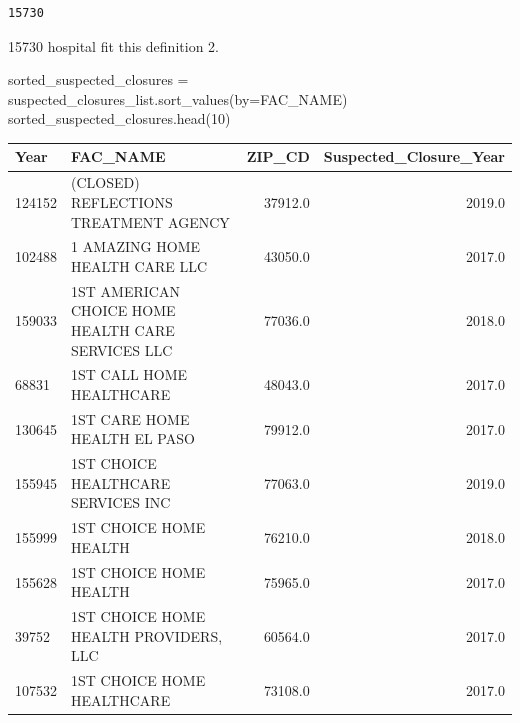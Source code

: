 \documentclass[
  letterpaper,
  DIV=11,
  numbers=noendperiod]{scrartcl}
\newenvironment{Shaded}{\begin{snugshade}}{\end{snugshade}}
\newcommand{\DecValTok}[1]{\textcolor[rgb]{0.68,0.00,0.00}{#1}}
\newcommand{\NormalTok}[1]{\textcolor[rgb]{0.00,0.23,0.31}{#1}}
\newcommand{\OperatorTok}[1]{\textcolor[rgb]{0.37,0.37,0.37}{#1}}
\newcommand{\StringTok}[1]{\textcolor[rgb]{0.13,0.47,0.30}{#1}}
\begin{document}
\begin{verbatim}
15730
\end{verbatim}

15730 hospital fit this definition 2.

\begin{Shaded}
\begin{Highlighting}[]
\NormalTok{sorted\_suspected\_closures }\OperatorTok{=}\NormalTok{ suspected\_closures\_list.sort\_values(by}\OperatorTok{=}\StringTok{\textquotesingle{}FAC\_NAME\textquotesingle{}}\NormalTok{)}
\NormalTok{sorted\_suspected\_closures.head(}\DecValTok{10}\NormalTok{)}
\end{Highlighting}
\end{Shaded}

\begin{tabular}{llrr}
\toprule
Year &                                           FAC\_NAME &   ZIP\_CD &  Suspected\_Closure\_Year \\
\midrule
124152 &              (CLOSED) REFLECTIONS TREATMENT AGENCY &  37912.0 &                  2019.0 \\
102488 &                     1 AMAZING HOME HEALTH CARE LLC &  43050.0 &                  2017.0 \\
159033 &  1ST AMERICAN CHOICE HOME HEALTH CARE SERVICES LLC &  77036.0 &                  2018.0 \\
68831  &                           1ST CALL HOME HEALTHCARE &  48043.0 &                  2017.0 \\
130645 &                       1ST CARE HOME HEALTH EL PASO &  79912.0 &                  2017.0 \\
155945 &                 1ST CHOICE HEALTHCARE SERVICES INC &  77063.0 &                  2019.0 \\
155999 &                             1ST CHOICE HOME HEALTH &  76210.0 &                  2018.0 \\
155628 &                             1ST CHOICE HOME HEALTH &  75965.0 &                  2017.0 \\
39752  &              1ST CHOICE HOME HEALTH PROVIDERS, LLC &  60564.0 &                  2017.0 \\
107532 &                         1ST CHOICE HOME HEALTHCARE &  73108.0 &                  2017.0 \\
\bottomrule
\end{tabular}
\end{document}

